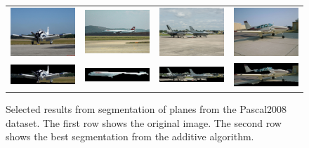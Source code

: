 \documentclass[10pt,twocolumn,letterpaper]{article}
\begin{document}
\begin{figure}[p]
\centering
\begin{tabular}{ p{3cm} p{3cm} p{3cm} p{3cm} }
\includegraphics[width=2.95cm]{figures/add_res/plane/2008_000021.jpg.eps} &
\includegraphics[width=2.95cm]{figures/add_res/plane/2008_001971.jpg.eps} &
\includegraphics[width=2.95cm]{figures/add_res/plane/2008_002673.jpg.eps} &
\includegraphics[width=2.95cm]{figures/add_res/plane/2008_002138.jpg.eps} \\
\includegraphics[width=2.95cm]{figures/add_res/plane/2008_000021.jpg_2_good.jpg.eps} &
\includegraphics[width=2.95cm]{figures/add_res/plane/2008_001971.jpg_2_good.jpg.eps} &
\includegraphics[width=2.95cm]{figures/add_res/plane/2008_002673.jpg_2_good.jpg.eps} &
\includegraphics[width=2.95cm]{figures/add_res/plane/2008_002138.jpg_2_good.jpg.eps} \\
\end{tabular}
\caption{Selected results from segmentation of planes from the Pascal2008
dataset.  The first row shows the original image.  The second row shows
the best segmentation from the additive algorithm.}
\label{fig:aeroplane_good_results}
\end{figure}
\end{document}
